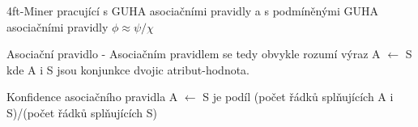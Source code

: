 4ft-Miner pracující s GUHA asociačními pravidly a s podmíněnými GUHA asociačními pravidly $\phi \approx  \psi / \chi $

Asociační pravidlo -  Asociačním pravidlem se tedy obvykle rozumí výraz A $\leftarrow$ S kde A i S jsou konjunkce dvojic atribut-hodnota. %

Konfidence asociačního pravidla A $\leftarrow$  S je podíl (počet řádků splňujících A i S)/(počet řádků splňujících S)  %










